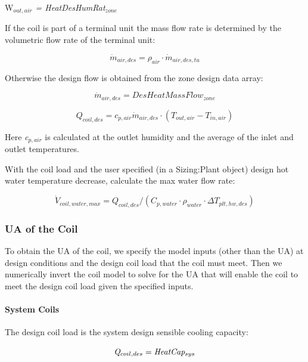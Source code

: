 W\emph{\(_{out,air}\) = HeatDesHumRat\(_{zone}\)}

If the coil is part of a terminal unit the mass flow rate is determined by the volumetric flow rate of the terminal unit:

\begin{equation}
\dot m_{air,des} = \rho_{air} \cdot \dot m_{air,des,tu}
\end{equation}

Otherwise the design flow is obtained from the zone design data array:

\begin{equation}
\dot m_{air,des} = DesHeatMassFlow_{zone}
\end{equation}

\begin{equation}
Q_{coil,des} = c_{p,air} \dot m_{air,des} \cdot (T_{out,air} - T_{in,air})
\end{equation}

Here \emph{c\(_{p,air}\)} is calculated at the outlet humidity and the average of the inlet and outlet temperatures.

With the coil load and the user specified (in a Sizing:Plant object) design hot water temperature decrease, calculate the max water flow rate:

\begin{equation}
\dot V_{coil,water,max} = Q_{coil,des}/(C_{p,water} \cdot \rho_{water} \cdot \Delta T_{plt,hw,des})
\end{equation}

\subsubsection{UA of the Coil}\label{ua-of-the-coil}

To obtain the UA of the coil, we specify the model inputs (other than the UA) at design conditions and the design coil load that the coil must meet. Then we numerically invert the coil model to solve for the UA that will enable the coil to meet the design coil load given the specified inputs.

\paragraph{System Coils}\label{system-coils-1}

The design coil load is the system design sensible cooling capacity:

\begin{equation}
\emph{Q\(_{coil,des}\)} = \emph{HeatCap\(_{sys}\)}
\end{equation}

